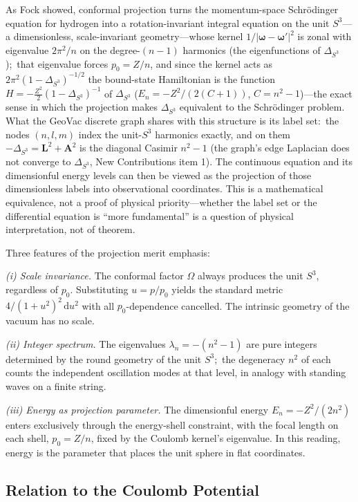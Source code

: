 \documentclass[aps,pra,twocolumn,superscriptaddress,longbibliography]{revtex4-2}
\newcommand{\gvc}[2]{#2}
\begin{document}
As Fock showed, conformal projection turns the momentum-space Schr\"odinger equation for hydrogen into a rotation-invariant integral equation on the unit $S^3$---a dimensionless, scale-invariant geometry---whose kernel $1/|\boldsymbol{\omega}-\boldsymbol{\omega}'|^2$ is zonal with eigenvalue $2\pi^2/n$ on the degree-$(n-1)$ harmonics (the eigenfunctions of $\Delta_{S^3}$);\ that eigenvalue forces $p_0 = Z/n$, and since the kernel acts as $2\pi^2(1-\Delta_{S^3})^{-1/2}$ the bound-state Hamiltonian is the function $H = -\tfrac{Z^2}{2}(1-\Delta_{S^3})^{-1}$ of $\Delta_{S^3}$ ($E_n = -Z^2/(2(C+1))$, $C = n^2-1$)---the exact sense in which the projection makes $\Delta_{S^3}$ equivalent to the Schr\"odinger problem. What the GeoVac discrete graph shares with this structure is its label set:\ the nodes $(n,l,m)$ index the unit-$S^3$ harmonics exactly, and on them $-\Delta_{S^3} = \mathbf{L}^2 + \mathbf{A}^2$ is the diagonal Casimir $n^2-1$ (\gvc{graph-s3-wall}{the graph's edge Laplacian does not converge to $\Delta_{S^3}$, New Contributions item 1}).  The continuous equation and its dimensionful energy levels can then be viewed as the projection of those dimensionless labels into observational coordinates. This is a mathematical equivalence, not a proof of physical priority---whether the label set or the differential equation is ``more fundamental'' is a question of physical interpretation, not of theorem.

Three features of the projection merit emphasis:

\textit{(i) Scale invariance.} The conformal factor $\Omega$ always produces the unit $S^3$, regardless of $p_0$. Substituting $u = p/p_0$ yields the standard metric $4/(1+u^2)^2\,\mathrm{d}u^2$ with all $p_0$-dependence cancelled. The intrinsic geometry of the vacuum has no scale.

\textit{(ii) Integer spectrum.} The eigenvalues $\lambda_n = -(n^2-1)$ are pure integers determined by the round geometry of the unit $S^3$;\ the degeneracy $n^2$ of each counts the independent oscillation modes at that level, in analogy with standing waves on a finite string.

\textit{(iii) Energy as projection parameter.} The dimensionful energy $E_n = -Z^2/(2n^2)$ enters exclusively through the energy-shell constraint, with the focal length on each shell, $p_0 = Z/n$, fixed by the Coulomb kernel's eigenvalue. In this reading, energy is the parameter that places the unit sphere in flat coordinates.

\subsection{Relation to the Coulomb Potential}
\end{document}
